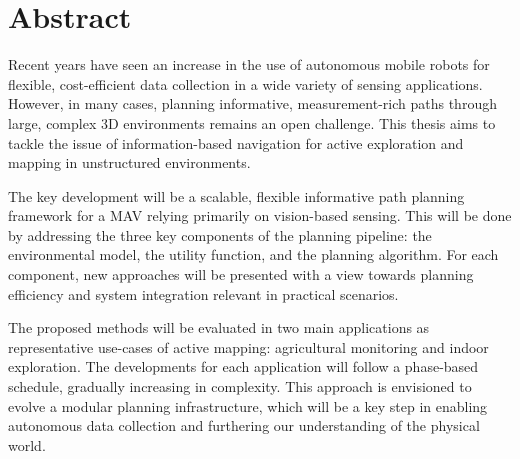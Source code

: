 \section*{Abstract}

Recent years have seen an increase in the use of autonomous mobile robots for flexible, cost-efficient data 
collection in a wide variety of sensing applications. However, in many cases, planning informative, 
measurement-rich paths through large, complex 3D environments remains an open challenge. This thesis aims to 
tackle the issue of information-based navigation for active exploration and mapping in 
unstructured environments.

The key development will be a scalable, flexible informative path planning framework for a MAV relying 
primarily on vision-based sensing. This will be done by addressing the three key components of the planning 
pipeline: the environmental model, the utility function, and the planning algorithm. For each component, new 
approaches will be presented with a view towards planning efficiency and system integration relevant 
in practical scenarios.

The proposed methods will be evaluated in two main applications as representative use-cases of active 
mapping: agricultural monitoring and indoor exploration. The developments for each application will follow a 
phase-based schedule, gradually increasing in complexity. This approach is envisioned to evolve a 
modular planning infrastructure, which will be a key step in enabling autonomous data collection and 
furthering our understanding of the physical world.